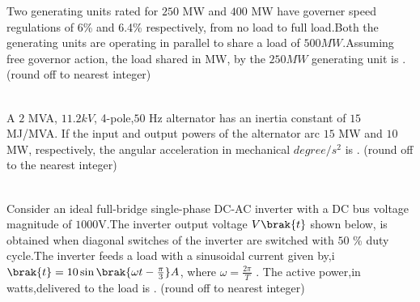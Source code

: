 \item Two generating units rated for $250$ MW and $400$ MW have governer speed regulations of 6\% and 6.4\%
respectively, from no load to full load.Both the generating units are operating in parallel to share a load of $500 MW$.Assuming free governor action, the load shared in MW, by the $250 MW$ generating unit is \underline{\hspace{2cm}}.(round off to nearest integer) \\ \\

\item A $2$ MVA, $11.2 kV$, 4-pole,$50$ Hz alternator has an inertia constant of $15$ MJ/MVA. If the input and output powers of the alternator arc $15$ MW and $10$MW, respectively, the angular acceleration in mechanical $degree/s^2$  is \underline{\hspace{2cm}}. (round off to the nearest integer)  \\ \\

\item Consider an ideal full-bridge single-phase DC-AC inverter with a DC bus voltage magnitude of $1000$V.The inverter output voltage $V\brak{t}$ shown below, is obtained when diagonal switches of the inverter are switched with $50$ \% duty cycle.The inverter feeds a load with a sinusoidal current
given by,i$\brak{t}=10\sin{\brak{{\omega}t-\frac{\pi}{3}}}A$, where  $\omega = \frac{2\pi}{T}$ . The active power,in watts,delivered to the load is \underline{\hspace{2cm}}. (round off to nearest integer) \\ \\ \\ \\
\begin{figure}[!ht]
\centering
{}%
\end{figure}

